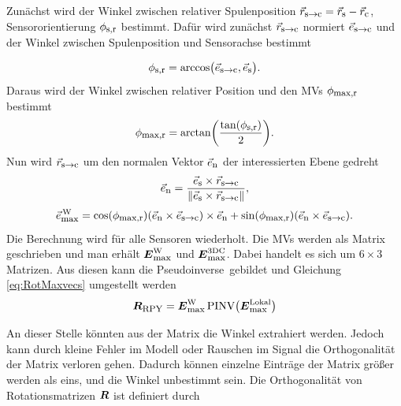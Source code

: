 Zunächst wird der Winkel zwischen relativer Spulenposition $\vec{r}_{\textrm{\footnotesize{s${\rightarrow}$c}}} = \vec{r}_{\textrm{\footnotesize{s}}}-\vec{r}_{\textrm{\footnotesize{c}}}$, Sensororientierung $\phi_{\textrm{\footnotesize{s,r}}}$ bestimmt. Dafür wird zunächst $\vec{r}_{\textrm{\footnotesize{s${\rightarrow}$c}}}$ normiert $\vec{e}_{\textrm{\footnotesize{s${\rightarrow}$c}}}$ und der Winkel zwischen Spulenposition und Sensorachse bestimmt

\begin{equation}
    \phi_{\textrm{\footnotesize{s,r}}} = \arccos\bigl(\vec{e}_{\textrm{\footnotesize{s${\rightarrow}$c}}},\vec{e}_{\textrm{\footnotesize{s}}}\bigr).    
\end{equation}
Daraus wird der Winkel zwischen relativer Position und den MVs $\phi_{\textrm{\footnotesize{max,r}}}$ bestimmt
\begin{equation}
    \phi_{\textrm{\footnotesize{max,r}}} = \arctan\biggl( \frac{\tan(\phi_{\textrm{\footnotesize{s,r}}})}{2}\biggr).
\end{equation}
Nun wird  $\vec{r}_{\textrm{\footnotesize{s${\rightarrow}$c}}}$ um den normalen Vektor $\vec{e}_{\textrm{\footnotesize{n}}}$ der interessierten Ebene gedreht
\begin{equation}
    \vec{e}_{\textrm{\footnotesize{n}}} = \frac{\vec{e}_{\textrm{\footnotesize{s}}} \times \vec{r}_{\textrm{\footnotesize{s${\rightarrow}$c}}}} {\|\vec{e}_{\textrm{\footnotesize{s}}} \times \vec{r}_{\textrm{\footnotesize{s${\rightarrow}$c}}}\|},
\end{equation}
\begin{equation}
    \vec{e}_{\textrm{\footnotesize{max}}}^{\,\text{W}} = \cos(\phi_{\textrm{\footnotesize{max,r}}})(\vec{e}_{\textrm{\footnotesize{n}}} \times \vec{e}_{\textrm{\footnotesize{s${\rightarrow}$c}}})\times \vec{e}_{\textrm{\footnotesize{n}}} + \sin(\phi_{\textrm{\footnotesize{max,r}}}) (\vec{e}_{\textrm{\footnotesize{n}}} \times\vec{e}_{\textrm{\footnotesize{s${\rightarrow}$c}}}).
\end{equation} 
Die Berechnung wird für alle Sensoren wiederholt. Die MVs werden als Matrix geschrieben und man erhält $\mbox{\boldmath ${E}$}_{\textrm{\footnotesize{max}}}^{\text{W}}$ und $\mbox{\boldmath ${E}$}_{\textrm{\footnotesize{max}}}^{\text{3DC}}$. 
Dabei handelt es sich um $6\times 3$ Matrizen. Aus diesen kann die Pseudoinverse\,\cite{penrose_generalized_1955} gebildet und Gleichung \ref{eq:RotMaxvecs} umgestellt werden
\begin{equation}
    \mbox{\boldmath ${R}$}_{\textrm{\footnotesize{RPY}}} =  \mbox{\boldmath ${E}$}_{\textrm{\footnotesize{max}}}^{\text{W}} \, \text{PINV}\bigl(\mbox{\boldmath ${E}$}_{\textrm{\footnotesize{max}}}^{\text{Lokal}}\bigr) 
    \label{eq:calcRotMat}
\end{equation}

An dieser Stelle könnten aus der Matrix die Winkel extrahiert werden. Jedoch kann durch kleine Fehler im Modell oder Rauschen im Signal die Orthogonalität der Matrix verloren gehen. Dadurch können einzelne Einträge der Matrix größer werden als eins, und die Winkel unbestimmt sein. Die Orthogonalität von Rotationsmatrizen $\mbox{\boldmath ${R}$}$ ist definiert durch 

